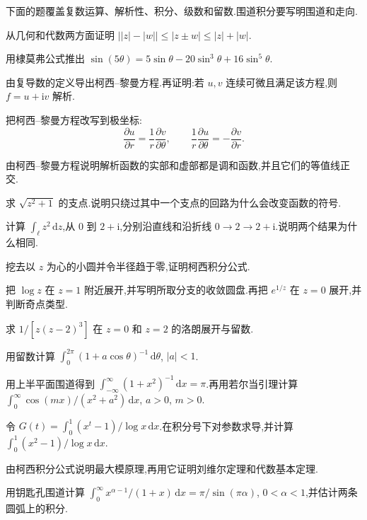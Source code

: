 下面的题覆盖复数运算、解析性、积分、级数和留数.围道积分要写明围道和走向.

\begin{problemset}
\renewcommand{\theenumi}{\thechapter.\arabic{enumi}}
\renewcommand{\labelenumi}{\theenumi.}
\item 从几何和代数两方面证明 $\bigl||z|-|w|\bigr|\leq|z\pm w|\leq|z|+|w|$.

\item 用棣莫弗公式推出 $\sin(5\theta)=5\sin\theta-20\sin^3\theta+16\sin^5\theta$.

\item 由复导数的定义导出柯西--黎曼方程.再证明:若 $u,v$ 连续可微且满足该方程,则 $f=u+\mathrm{i}v$ 解析.

\item 把柯西--黎曼方程改写到极坐标:
\begin{equation*}
  \frac{\partial u}{\partial r}=\frac{1}{r}\frac{\partial v}{\partial\theta},
  \qquad
  \frac{1}{r}\frac{\partial u}{\partial\theta}=-\frac{\partial v}{\partial r}.
\end{equation*}

\item 由柯西--黎曼方程说明解析函数的实部和虚部都是调和函数,并且它们的等值线正交.

\item 求 $\sqrt{z^2+1}$ 的支点.说明只绕过其中一个支点的回路为什么会改变函数的符号.

\item 计算 $\int_\ell z^2\,\mathrm{d}z$,从 $0$ 到 $2+\mathrm{i}$,分别沿直线和沿折线 $0\to 2\to 2+\mathrm{i}$.说明两个结果为什么相同.

\item 挖去以 $z$ 为心的小圆并令半径趋于零,证明柯西积分公式.

\item 把 $\log z$ 在 $z=1$ 附近展开,并写明所取分支的收敛圆盘.再把 $e^{1/z}$ 在 $z=0$ 展开,并判断奇点类型.

\item 求 $1/[z(z-2)^3]$ 在 $z=0$ 和 $z=2$ 的洛朗展开与留数.

\item 用留数计算 $\int_0^{2\pi}(1+a\cos\theta)^{-1}\,\mathrm{d}\theta$, $|a|<1$.

\item 用上半平面围道得到 $\int_{-\infty}^{\infty}(1+x^2)^{-1}\,\mathrm{d}x=\pi$.再用若尔当引理计算 $\int_0^{\infty}\cos(mx)/(x^2+a^2)\,\mathrm{d}x$, $a>0$, $m>0$.

\item 令 $G(t)=\int_0^1(x^t-1)/\log x\,\mathrm{d}x$.在积分号下对参数求导,并计算 $\int_0^1(x^2-1)/\log x\,\mathrm{d}x$.

\item 由柯西积分公式说明最大模原理,再用它证明刘维尔定理和代数基本定理.

\item 用钥匙孔围道计算 $\int_0^{\infty}x^{\alpha-1}/(1+x)\,\mathrm{d}x=\pi/\sin(\pi\alpha)$, $0<\alpha<1$,并估计两条圆弧上的积分.
\end{problemset}
